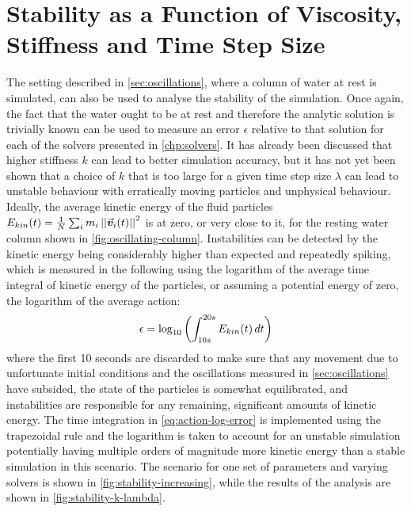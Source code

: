\newpage

\section{Stability as a Function of Viscosity, Stiffness and Time Step Size}
The setting described in \autoref{sec:oscillations}, where a column of water at rest is simulated, can also be used to analyse the stability of the simulation. Once again, the fact that the water ought to be at rest and therefore the analytic solution is trivially known can be used to measure an error $\epsilon$ relative to that solution for each of the solvers presented in \autoref{chp:solvers}. It has already been discussed that higher stiffness $k$ can lead to better simulation accuracy, but it has not yet been shown that a choice of $k$ that is too large for a given time step size $\lambda$ can lead to unstable behaviour with erratically moving particles and unphysical behaviour. Ideally, the average kinetic energy of the fluid particles $E_{kin}(t) = \frac{1}{N}\sum_i m_i \left|\left|\vec{\bm{v}}_i(t)\right|\right|^2$ is at zero, or very close to it, for the resting water column shown in \autoref{fig:oscillating-column}. Instabilities can be detected by the kinetic energy being considerably higher than expected and repeatedly spiking, which is measured in the following using the logarithm of the average time integral of kinetic energy of the particles, or assuming a potential energy of zero, the logarithm of the average action:
\begin{equation}\label{eq:action-log-error}
  \epsilon = \log_{10}\left(\int_{10s}^{20s} E_{kin}(t) \,dt\right)
\end{equation}
where the first 10 seconds are discarded to make sure that any movement due to unfortunate initial conditions and the oscillations measured in \autoref{sec:oscillations} have subsided, the state of the particles is somewhat equilibrated, and instabilities are responsible for any remaining, significant amounts of kinetic energy. The time integration in \autoref{eq:action-log-error} is implemented using the trapezoidal rule and the logarithm is taken to account for an unstable simulation potentially having multiple orders of magnitude more kinetic energy than a stable simulation in this scenario. The scenario for one set of parameters and varying solvers is shown in \autoref{fig:stability-increasing}, while the results of the analysis are shown in \autoref{fig:stability-k-lambda}.



